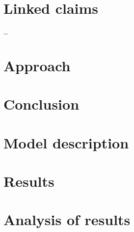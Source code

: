 \section*{Linked claims}
\ldots

\section*{Approach}


\section*{Conclusion} 


\section*{Model description}


\section*{Results}


\section*{Analysis of results}


\printrefsegment
